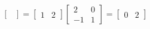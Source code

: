 \begin{enumerate}[label=(\alph*)]
\[\begin{bmatrix}
                \end{bmatrix}
                =
                \begin{bmatrix}
                    1 & 2
                \end{bmatrix}
                \begin{bmatrix}
                    2 & 0 \\
                    -1 & 1
                \end{bmatrix}
                =
                \begin{bmatrix}
                    0 & 2
                \end{bmatrix}
            \]
        \end{enumerate}